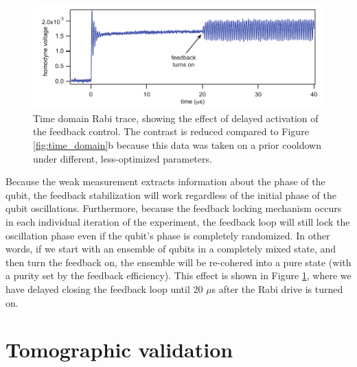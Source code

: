 \begin{figure}
\begin{center}
	\includegraphics[width = 6in]{qfb_results_chapter/rephase}
\end{center}
\caption[Feedback re-phases a mixed state]{Time domain Rabi trace, showing the effect of delayed activation of the feedback control.  The  contrast is reduced compared to Figure \ref{fig:time_domain}b because this data was taken on a prior cooldown under different, less-optimized parameters.}
\label{fig:rephase}
\end{figure}

Because the weak measurement extracts information about the phase of the qubit, the feedback stabilization will work regardless of the initial phase of the qubit oscillations.  Furthermore, because the feedback locking mechanism occurs in each individual iteration of the experiment, the feedback loop will still lock the oscillation phase even if the qubit's phase is completely randomized.  In other words, if we start with an ensemble of qubits in a completely mixed state, and then turn the feedback on, the ensemble will be re-cohered into a pure state (with a purity set by the feedback efficiency).  This effect is shown in Figure \ref{fig:rephase}, where we have delayed closing the feedback loop until 20 $\mu$s after the Rabi drive is turned on.

\section{Tomographic validation}

